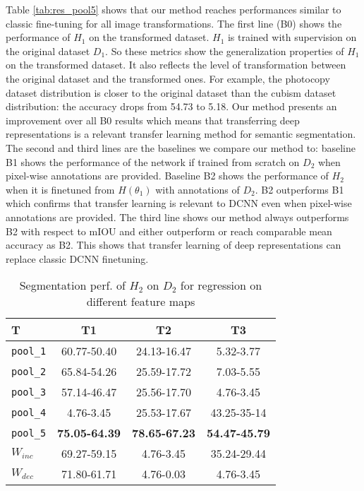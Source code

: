\documentclass{bmvc2k}
\begin{document}
Table \ref{tab:res_pool5} shows that our method reaches performances similar to 
classic fine-tuning for all image transformations. 
The first line (B0) shows the performance of $H_1$ on the transformed dataset. 
$H_1$ is trained with supervision on the original dataset $D_1$. So these metrics show the generalization
properties of $H_1$ on the transformed dataset. It also reflects the level of transformation between the original dataset
and the transformed ones. For example, the photocopy dataset distribution is closer to the 
original dataset than the cubism dataset distribution: the accuracy drops from 54.73 to 5.18. 
Our method presents an improvement over all B0 results which means that 
transferring deep representations is a relevant transfer learning method for semantic segmentation.
The second and third lines are the baselines we compare our method to: baseline B1 shows the performance 
of the network if trained from scratch  on $D_2$ when pixel-wise annotations
are provided. 
Baseline B2 shows the performance of $H_2$ when it is finetuned from $H(\theta_1)$ with annotations of $D_2$. 
B2 outperforms B1 which confirms that transfer learning is relevant to DCNN
even when pixel-wise annotations are provided. 
The third line shows our method always outperforms B2 with respect to mIOU 
and either outperform or reach comparable mean accuracy as B2. This shows that 
transfer learning of deep representations can replace classic DCNN finetuning.

\begin{table}
\begin{center}
\begin{tabular}{|l|c|c|c|}
\hline
T       & T1              & T2     & T3 \\
\hline
  \texttt{pool\_1}   &60.77-50.40 &24.13-16.47 &5.32-3.77\\
\hline
  \texttt{pool\_2}   &65.84-54.26 &25.59-17.72 &7.03-5.55\\
\hline
  \texttt{pool\_3} &57.14-46.47   &25.56-17.70   &4.76-3.45 \\
\hline
  \texttt{pool\_4}  &4.76-3.45    &25.53-17.67  &43.25-35-14\\
\hline
  \texttt{pool\_5}   &\textbf{75.05-64.39}&\textbf{78.65-67.23}&\textbf{54.47-45.79} \\
\hline
  $W_{inc}$ &69.27-59.15 & 4.76-3.45 & 35.24-29.44 \\
\hline 
  $W_{dec}$ &71.80-61.71 & 4.76-0.03 & 4.76-3.45 \\
\hline
\end{tabular}
\end{center}
\caption{Segmentation perf. of $H_2$ on $D_2$ for regression on different feature maps}
\label{tab:feat_res}
\end{table}
\end{document}
